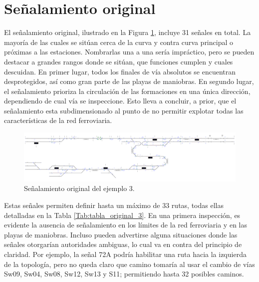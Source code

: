 \section{Señalamiento original}

    El señalamiento original, ilustrado en la Figura \ref{fig:EJ3_2}, incluye 31 señales en total. La mayoría de las cuales se sitúan cerca de la curva y contra curva principal o próximas a las estaciones. Nombrarlas una a una sería impráctico, pero se pueden destacar a grandes rangos donde se sitúan, que funciones cumplen y cuales descuidan. En primer lugar, todos los finales de vía absolutos se encuentran desprotegidos, así como gran parte de las playas de maniobras. En segundo lugar, el señalamiento prioriza la circulación de las formaciones en una única dirección, dependiendo de cual vía se inspeccione. Esto lleva a concluir, a prior, que el señalamiento esta subdimensionado al punto de no permitir explotar todas las características de la red ferroviaria.
    
    \begin{figure}[H]
    	\centering
    	\includegraphics[width=1\textwidth]{resultados-obtenidos/ejemplo3/images/3_original.png}
    	\centering\caption{Señalamiento original del ejemplo 3.}
    	\label{fig:EJ3_2}
    \end{figure}
    
    Estas señales permiten definir hasta un máximo de 33 rutas, todas ellas detalladas en la Tabla \ref{Tab:tabla_original_3}. En una primera inspección, es evidente la ausencia de señalamiento en los límites de la red ferroviaria y en las playas de maniobras. Incluso pueden advertirse alguna situaciones donde las señales otorgarían autoridades ambiguas, lo cual va en contra del principio de claridad. Por ejemplo, la señal 72A podría habilitar una ruta hacia la izquierda de la topología, pero no queda claro que camino tomaría al usar el cambio de vías Sw09, Sw04, Sw08, Sw12, Sw13 y S11; permitiendo hasta 32 posibles caminos.
    
